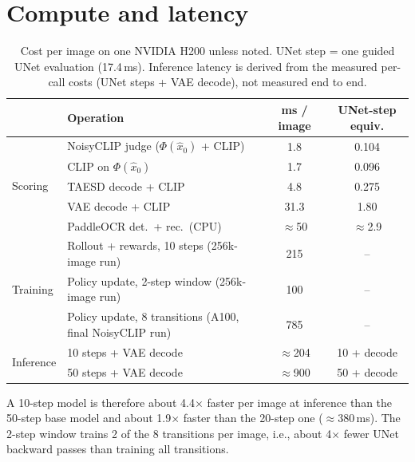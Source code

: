 \documentclass{article}
\newcommand{\xhat}{\hat{x}_0}
\begin{document}
\section{Compute and latency}
\label{app:compute}

\begin{table}[h]
  \caption{Cost per image on one NVIDIA H200 unless noted. UNet step = one guided UNet evaluation (17.4\,ms). Inference latency
  is derived from the measured per-call costs (UNet steps + VAE decode), not measured end to end.}
  \label{tab:compute}
  \centering
  \small
  \begin{tabular}{llcc}
    \toprule
    & Operation & ms / image & UNet-step equiv. \\
    \midrule
    \multirow{5}{*}{Scoring} & NoisyCLIP judge ($\Phi(\xhat)$ + CLIP) & 1.8 & 0.104 \\
    & CLIP on $\Phi(\xhat)$ & 1.7 & 0.096 \\
    & TAESD decode + CLIP & 4.8 & 0.275 \\
    & VAE decode + CLIP & 31.3 & 1.80 \\
    & PaddleOCR det.\ + rec.\ (CPU) & $\approx$50 & $\approx$2.9 \\
    \midrule
    \multirow{3}{*}{Training} & Rollout + rewards, 10 steps (256k-image run) & 215 & -- \\
    & Policy update, 2-step window (256k-image run) & 100 & -- \\
    & Policy update, 8 transitions (A100, final NoisyCLIP run) & 785 & -- \\
    \midrule
    \multirow{2}{*}{Inference} & 10 steps + VAE decode & $\approx$204 & 10 + decode \\
    & 50 steps + VAE decode & $\approx$900 & 50 + decode \\
    \bottomrule
  \end{tabular}
\end{table}

A 10-step model is therefore about 4.4$\times$ faster per image at inference than the 50-step base model and about
1.9$\times$ faster than the 20-step one ($\approx$380\,ms). The 2-step window trains
2 of the 8 transitions per image, i.e., about 4$\times$ fewer UNet backward passes than training all transitions.
\end{document}
